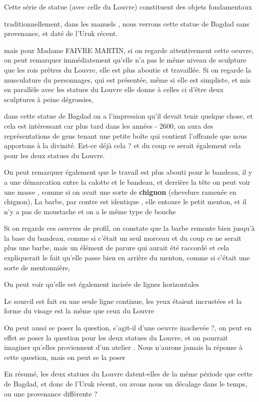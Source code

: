\documentclass[a4paper,10pt]{article}
\begin{document}
\begin{itemize}
Cette série de statue (avec celle du Louvre) constituent des objets
fondamentaux

traditionnellement, dans les manuels , nous verrons cette statue de
Bagdad sans provenance, et daté de l'Uruk récent.

mais pour Madame FAIVRE MARTIN, si on regarde attentivement cette
oeuvre, on peut remarquer immédiatement qu'elle
n'a pas le même niveau de sculpture que les rois
prêtres du Louvre, elle est plus aboutie et travaillée. Si on regarde
la musculature du personnages, qui est présentée, même si elle est
simpliste, et mis en parallèle avec les statues du Louvre elle donne à
celles ci d'être deux sculptures à peine dégrossies,  

dans cette statue de Bagdad on a l'impression
qu'il devait tenir quelque chose, et cela est
intéressant car plus tard dans les années - 2600, on aura des
représentations de gens tenant une petite boîte qui contient
l'offrande que nous apportons à la divinité. Est-ce
déjà cela ? et du coup ce serait également cela pour les deux statues
du Louvre.

On peut remarquer également que le travail est plus abouti pour le
bandeau, il y a une démarcation entre la calotte et le bandeau, et
derrière la tête on peut voir une masse , comme si on avait une sorte
de \textbf{chignon }(chevelure ramenée en chignon),  La barbe, par
contre est identique , elle entoure le petit menton, et il
n'y a pas de moustache et on a le même type de bouche

Si on regarde ces oeuvres de profil, on constate que la barbe remonte
bien jusqu'à la base du bandeau, comme si
c'était un seul morceau et du coup ce ne serait plus
une barbe, mais un élément de parure qui aurait été raccordé et cela
expliquerait le fait qu'elle passe bien en arrière du
menton, comme si c'était une sorte de mentonnière,

On peut voir qu'elle est également incisée de lignes
horizontales

Le sourcil est fait en une seule ligne continue, les yeux étaient
incrustées et la forme du visage est la même que ceux du Louvre

On peut aussi se poser la question, s'agit-il
d'une oeuvre inachevée ?, on peut en effet se poser la
question pour les deux statues du Louvre, et on pourrait imaginer
qu'elles proviennent d'un atelier .
Nous n'aurons jamais la réponse à cette question, mais
on peut se la poser

En résumé, les deux statues du Louvre datent-elles de la même période
que cette de Bagdad, et donc de l'Uruk récent, ou
avons nous un décalage dans le temps, ou une provenance différente ?


\end{itemize}
\end{document}
